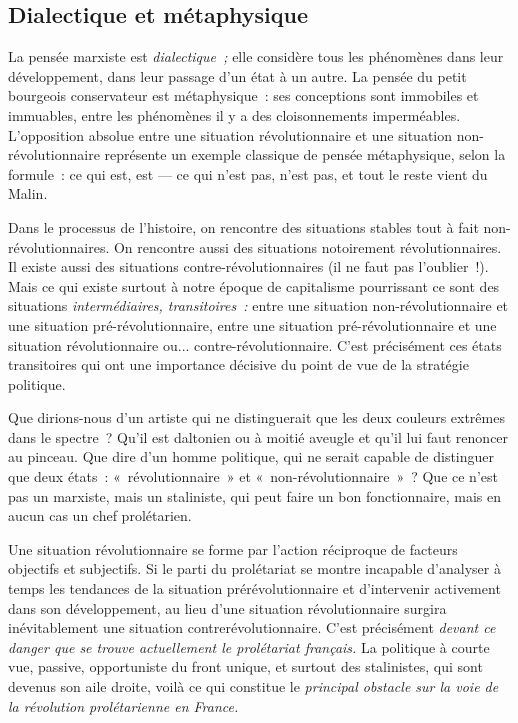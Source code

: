 \documentclass[french,twoside]{book} %
\begin{document}
\subsection[{Dialectique et métaphysique}]{Dialectique et métaphysique}
\noindent La pensée marxiste est \emph{dialectique ;} elle considère tous les phénomènes dans leur développement, dans leur passage d’un état à un autre. La pensée du petit bourgeois conservateur est métaphysique : ses conceptions sont immobiles et immuables, entre les phénomènes il y a des cloisonnements imperméables. L’opposition absolue entre une situation révolutionnaire et une situation non-révolutionnaire représente un exemple classique de pensée métaphysique, selon la formule : ce qui est, est — ce qui n’est pas, n’est pas, et tout le reste vient du Malin.\par
Dans le processus de l’histoire, on rencontre des situations stables tout à fait non-révolutionnaires. On rencontre aussi des situations notoirement révolutionnaires. Il existe aussi des situations contre-révolutionnaires (il ne faut pas l’oublier !). Mais ce qui existe surtout à notre époque de capitalisme pourrissant ce sont des situations \emph{intermédiaires, transitoires :} entre une situation non-révolutionnaire et une situation pré-révolutionnaire, entre une situation pré-révolutionnaire et une situation révolutionnaire ou... contre-révolutionnaire. C’est précisément ces états transitoires qui ont une importance décisive du point de vue de la stratégie politique.\par
Que dirions-nous d’un artiste qui ne distinguerait que les deux couleurs extrêmes dans le spectre ? Qu’il est daltonien ou à moitié aveugle et qu’il lui faut renoncer au pinceau. Que dire d’un homme politique, qui ne serait  capable de distinguer que deux états : « révolutionnaire » et « non-révolutionnaire » ? Que ce n’est pas un marxiste, mais un staliniste, qui peut faire un bon fonctionnaire, mais en aucun cas un chef prolétarien.\par
Une situation révolutionnaire se forme par l’action réciproque de facteurs objectifs et subjectifs. Si le parti du prolétariat se montre incapable d’analyser à temps les tendances de la situation prérévolutionnaire et d’intervenir activement dans son développement, au lieu d’une situation révolutionnaire surgira inévitablement une situation contrerévolutionnaire. C’est précisément \emph{devant ce danger que se trouve actuellement le prolétariat français.} La politique à courte vue, passive, opportuniste du front unique, et surtout des stalinistes, qui sont devenus son aile droite, voilà ce qui constitue le \emph{principal obstacle sur la voie de la révolution prolétarienne en France.}
\end{document}
